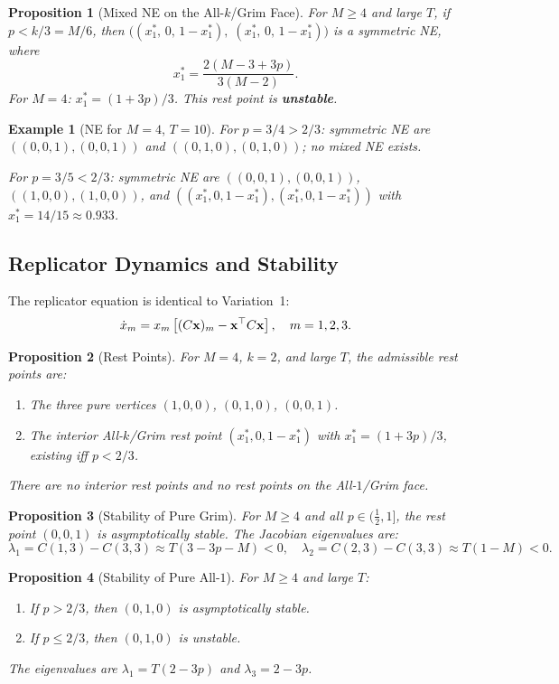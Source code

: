 \documentclass[12pt,a4paper]{article}
\newtheorem{proposition}{Proposition}[section]
\newtheorem{example}{Example}[section]
\begin{document}
\begin{proposition}[Mixed NE on the All-$k$/Grim Face]\label{prop:v2_mixed_13}
For $M\geq 4$ and large $T$, if $p < k/3 = M/6$, then
$\bigl((x_1^*,\,0,\,1-x_1^*),\;(x_1^*,\,0,\,1-x_1^*)\bigr)$
is a symmetric NE, where
\[
  x_1^* = \frac{2(M-3+3p)}{3(M-2)}.
\]
For $M=4$: $x_1^* = (1+3p)/3$. This rest point is \textbf{unstable}.
\end{proposition}

\begin{example}[NE for $M=4$, $T=10$]
For $p=3/4>2/3$: symmetric NE are $((0,0,1),(0,0,1))$ and $((0,1,0),(0,1,0))$;
no mixed NE exists.

For $p=3/5<2/3$: symmetric NE are $((0,0,1),(0,0,1))$, $((1,0,0),(1,0,0))$,
and $((x_1^*,0,1-x_1^*),(x_1^*,0,1-x_1^*))$ with $x_1^*=14/15\approx 0.933$.
\end{example}

\subsection{Replicator Dynamics and Stability}

The replicator equation is identical to Variation~1:
\[
  \dot{x}_m = x_m\left[(C{\bf x})_m - {\bf x}^\top C{\bf x}\right], \quad m=1,2,3.
\]

\begin{proposition}[Rest Points]\label{prop:v2_restpoints}
For $M=4$, $k=2$, and large $T$, the admissible rest points are:
\begin{enumerate}
  \item The three pure vertices $(1,0,0)$, $(0,1,0)$, $(0,0,1)$.
  \item The interior All-$k$/Grim rest point $(x_1^*,0,1-x_1^*)$ with $x_1^*=(1+3p)/3$,
        existing iff $p<2/3$.
\end{enumerate}
There are no interior rest points and no rest points on the All-$1$/Grim face.
\end{proposition}

\begin{proposition}[Stability of Pure Grim]\label{prop:v2_stab_grim}
For $M\geq 4$ and all $p\in(\tfrac{1}{2},1]$, the rest point $(0,0,1)$ is
asymptotically stable. The Jacobian eigenvalues are:
\[
  \lambda_1 = C(1,3)-C(3,3)\approx T(3-3p-M)<0, \quad
  \lambda_2 = C(2,3)-C(3,3)\approx T(1-M)<0.
\]
\end{proposition}

\begin{proposition}[Stability of Pure All-$1$]\label{prop:v2_stab_allone}
For $M\geq 4$ and large $T$:
\begin{enumerate}
  \item If $p>2/3$, then $(0,1,0)$ is asymptotically stable.
  \item If $p\leq 2/3$, then $(0,1,0)$ is unstable.
\end{enumerate}
The eigenvalues are $\lambda_1=T(2-3p)$ and $\lambda_3=2-3p$.
\end{proposition}
\end{document}
